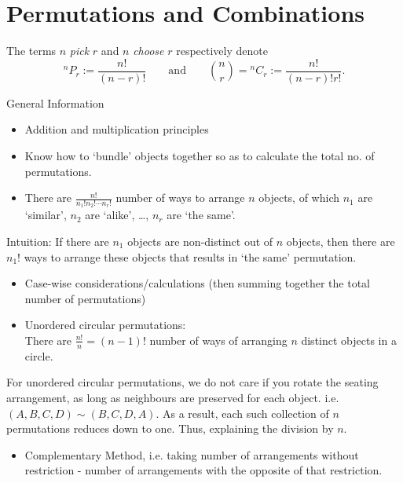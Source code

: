 \documentclass[oneside]{book}
\begin{document}
\chapter{Permutations and Combinations}
\begin{definition}{}{}
  The terms \(n\) \emph{pick} \(r\) and \(n\) \emph{choose} \(r\) respectively denote 
  \[{^n}P_r := \frac{n!}{(n-r)!} \qquad\text{and}\qquad \binom{n}{r}={^n}C_r:=\frac{n!}{(n-r)!r!}.\]
\end{definition}
\begin{stbox}{General Information}
  \begin{itemize}
    \item Addition and multiplication principles
    \item Know how to `bundle' objects together so as to calculate the total no. of permutations.
    \item There are \(\frac{n!}{n_1!n_2!\cdots n_r!}\) number of ways to arrange \(n\) objects, of which \(n_1\) are `similar', \(n_2\) are `alike', \ldots, \(n_r\) are `the same'.
  \end{itemize}
\end{stbox}
    \begin{fact}
      Intuition: If there are \(n_1\) objects are non-distinct out of \(n\) objects, then there are \(n_1!\) ways to arrange these objects that results in `the same' permutation.
    \end{fact}
  \begin{stbox}{}
  \begin{itemize}
    \item Case-wise considerations/calculations (then summing together the total number of permutations)
    \item Unordered circular permutations:\\
    There are \(\frac{n!}{n}=(n-1)!\) number of ways of arranging \(n\) distinct objects in a circle.
  \end{itemize}
\end{stbox}
    \begin{fact}
      For unordered circular permutations, we do not care if you rotate the seating arrangement, as long as neighbours are preserved for each object. i.e. \((A,B,C,D) \sim (B,C,D,A)\). As a result, each such collection of \(n\) permutations reduces down to one. Thus, explaining the division by \(n\).
    \end{fact}
\begin{stbox}{}
\begin{itemize}
    \item Complementary Method, i.e. taking number of arrangements without restriction - number of arrangements with the opposite of that restriction.
\end{itemize}
\end{stbox}
\end{document}
